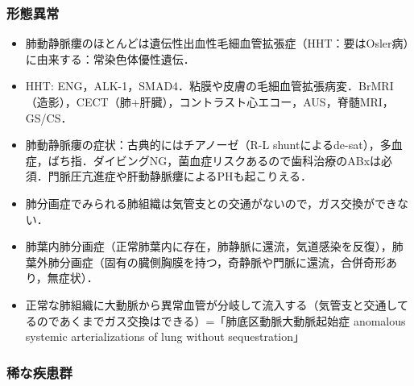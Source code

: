 \subsubsection{形態異常}

\begin{itemize}
\item 肺動静脈瘻のほとんどは遺伝性出血性毛細血管拡張症（HHT：要はOsler病）に由来する：常染色体優性遺伝．
\item HHT: ENG，ALK-1，SMAD4．粘膜や皮膚の毛細血管拡張病変．BrMRI（造影），CECT（肺+肝臓），コントラスト心エコー，AUS，脊髄MRI，GS/CS．
\item 肺動静脈瘻の症状：古典的にはチアノーゼ（R-L shuntによるde-sat），多血症，ばち指．ダイビングNG，菌血症リスクあるので歯科治療のABxは必須．門脈圧亢進症や肝動静脈瘻によるPHも起こりえる．
\item 肺分画症でみられる肺組織は気管支との交通がないので，ガス交換ができない．
\item 肺葉内肺分画症（正常肺葉内に存在，肺静脈に還流，気道感染を反復），肺葉外肺分画症（固有の臓側胸膜を持つ，奇静脈や門脈に還流，合併奇形あり，無症状）．
\item 正常な肺組織に大動脈から異常血管が分岐して流入する（気管支と交通してるのであくまでガス交換はできる）=「肺底区動脈大動脈起始症 anomalous systemic arterializations of lung without sequestration」
\end{itemize}


\subsubsection{稀な疾患群}

